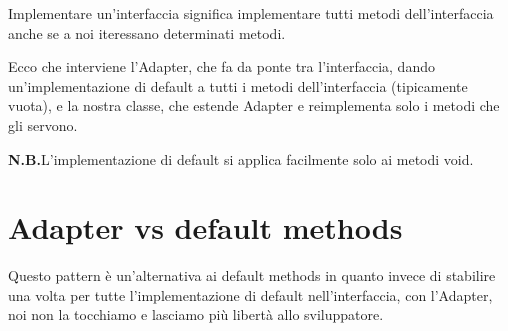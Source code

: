 Implementare un'interfaccia significa implementare tutti metodi dell'interfaccia anche se a noi iteressano determinati metodi.

Ecco che interviene l'Adapter, che fa da ponte tra l'interfaccia, dando un'implementazione di default a tutti i metodi dell'interfaccia (tipicamente vuota), e la 
nostra classe, che estende Adapter e reimplementa solo i metodi che gli servono.

\medskip
\textbf{N.B.}L'implementazione di default si applica facilmente solo ai metodi void.

\section{Adapter vs default methods}

Questo pattern è un'alternativa ai default methods in quanto invece di stabilire una volta per tutte l'implementazione di default nell'interfaccia, con l'Adapter, noi 
non la tocchiamo e lasciamo più libertà allo sviluppatore.
